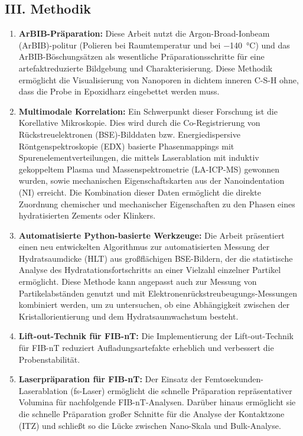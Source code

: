 \documentclass[11pt, a4paper]{article}
\begin{document}
\subsection*{III. Methodik}

\begin{enumerate}[label=\textbf{\arabic*.}, leftmargin=1.5cm, labelsep=0.5cm, itemsep=0.5em, resume]
    \item \textbf{ArBIB-Präparation:} Diese Arbeit nutzt die Argon-Broad-Ionbeam (ArBIB)-politur (Polieren bei Raumtemperatur und bei \qty{-140}{\celsius}) und das ArBIB-Böschungsätzen als wesentliche Präparationsschritte für eine artefaktreduzierte Bildgebung und Charakterisierung.
    Diese Methodik ermöglicht die Visualisierung von Nanoporen in dichtem inneren C-S-H ohne, dass die Probe in Epoxidharz eingebettet werden muss.
    \item \textbf{Multimodale Korrelation:} Ein Schwerpunkt dieser Forschung ist die Korellative Mikroskopie. Dies wird durch die Co-Registrierung von Rückstreuelektronen (BSE)-Bilddaten bzw. Energiedispersive Röntgenspektroskopie (EDX) basierte Phasenmappings mit Spurenelementverteilungen, die mittels Laserablation mit induktiv gekoppeltem Plasma und Massenspektrometrie (LA-ICP-MS) gewonnen wurden, sowie mechanischen Eigenschaftskarten aus der Nanoindentation (NI) erreicht.
    Die Kombination dieser Daten ermöglicht die direkte Zuordnung chemischer und mechanischer Eigenschaften zu den Phasen eines hydratisierten Zements oder Klinkers.
    \item \textbf{Automatisierte Python-basierte Werkzeuge:} Die Arbeit präsentiert einen neu entwickelten Algorithmus zur automatisierten Messung der Hydratsaumdicke (HLT) aus großflächigen BSE-Bildern, der die statistische Analyse des Hydratationsfortschritts an einer Vielzahl einzelner Partikel ermöglicht.
    Diese Methode kann angepasst auch zur Messung von Partikelabständen genutzt und mit Elek\-tro\-nen\-rück\-streu\-beu\-gungs-Messungen kombiniert werden, um zu untersuchen, ob eine Abhängigkeit zwischen der Kristallorientierung und dem Hydratsaumwachstum besteht.
    \item \textbf{Lift-out-Technik für FIB-nT:} Die Implementierung der Lift-out-Technik für FIB-nT reduziert Aufladungsartefakte erheblich und verbessert die Probenstabilität.
    \item \textbf{Laserpräparation für FIB-nT:} Der Einsatz der Femtosekunden-Laserablation (fs-Laser) ermöglicht die schnelle Präparation repräsentativer Volumina für nachfolgende FIB-nT-Analysen. Darüber hinaus ermöglicht sie die schnelle Präparation großer Schnitte für die Analyse der Kontaktzone (ITZ) und schließt so die Lücke zwischen Nano-Skala und Bulk-Analyse.
\end{enumerate}
\end{document}
